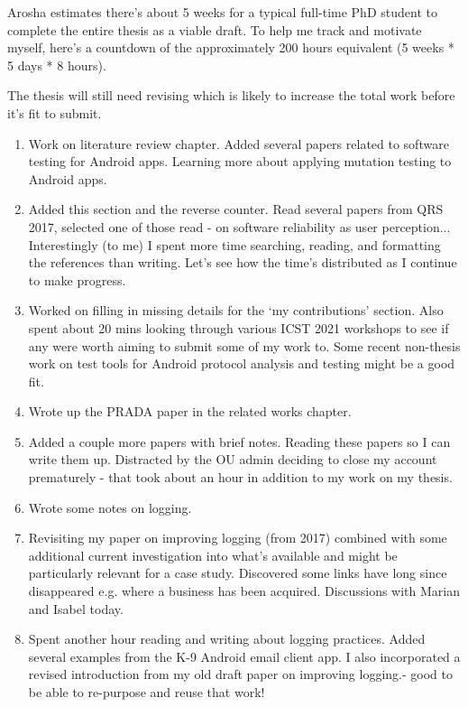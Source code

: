 Arosha estimates there's about 5 weeks for a typical full-time PhD student to complete the entire thesis as a viable draft. To help me track and motivate myself, here's a countdown of the approximately 200 hours equivalent (5 weeks * 5 days * 8 hours).

The thesis will still need revising which is likely to increase the total work before it's fit to submit.
\newcommand\reverselabel[1]{%
  \def\theenumi{}%
  \renewcommand\makelabel{\makebox[\dimexpr\labelwidth-3pt\relax][r]{%
    \the\numexpr#1-\value{enumi}+1\relax}}}%

\begin{enumerate}
    \reverselabel{200}
    \item Work on literature review chapter. Added several papers related to software testing for Android apps. Learning more about applying mutation testing to Android apps.
    \item Added this section and the reverse counter. Read several papers from QRS 2017, selected one of those read - on software reliability as user perception... Interestingly (to me) I spent more time searching, reading, and formatting the references than writing. Let's see how the time's distributed as I continue to make progress.
    \item Worked on filling in missing details for the `my contributions' section. Also spent about 20 mins looking through various ICST 2021 workshops to see if any were worth aiming to submit some of my work to. Some recent non-thesis work on test tools for Android protocol analysis and testing might be a good fit.
    \item Wrote up the PRADA paper in the related works chapter. 
    \item Added a couple more papers with brief notes. Reading these papers so I can write them up. Distracted by the OU admin deciding to close my account prematurely - that took about an hour in addition to my work on my thesis.
    \item Wrote some notes on logging.
    \item Revisiting my paper on improving logging (from 2017) combined with some additional current investigation into what's available and might be particularly relevant for a case study. Discovered some links have long since disappeared e.g. where a business has been acquired. Discussions with Marian and Isabel today.
    \item Spent another hour reading and writing about logging practices. Added several examples from the K-9 Android email client app. I also incorporated a revised introduction from my old draft paper on improving logging.- good to be able to re-purpose and reuse that work!

\end{enumerate}
